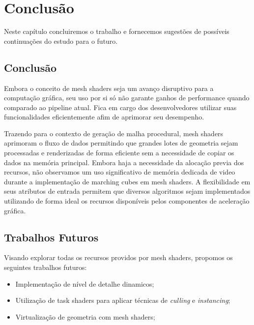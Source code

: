 \chapter{Conclusão}\label{chp:LABEL_CONCLUSAO}

Neste capítulo concluiremos o trabalho e fornecemos sugestões de possíveis continuações do estudo para o futuro.

\section{Conclusão}\label{sec:LABEL_CONCLUSAO_SEC_A}

Embora o conceito de mesh shaders seja um avanço disruptivo para a computação gráfica, seu uso por si só não garante ganhos de performance quando comparado ao pipeline atual. Fica em cargo dos desenvolvedores utilizar suas funcionalidades eficientemente afim de aprimorar seu desempenho.

Trazendo para o contexto de geração de malha procedural, mesh shaders aprimoram o fluxo de dados permitindo que grandes lotes de geometria sejam processadas e renderizadas de forma eficiente sem a necessidade de copiar os dados na memória principal. Embora haja a necessidade da alocação previa dos recursos, não observamos um uso significativo de memória dedicada de video durante a implementação de marching cubes em mesh shaders. A flexibilidade em seus atributos de entrada permitem que diversos algoritmos sejam implementados utilizando de forma ideal os recursos disponíveis pelos componentes de aceleração gráfica.

\section{Trabalhos Futuros}\label{sec:LABEL_CONCLUSAO_SEC_B}

Visando explorar todas os recursos providos por mesh shaders, propomos os seguintes trabalhos futuros:

\begin{itemize}
    \item Implementação de nível de detalhe dinamicos;
    \item Utilização de task shaders para aplicar técnicas de \textit{culling} e \textit{instancing};
    \item Virtualização de geometria com mesh shaders;
\end{itemize}